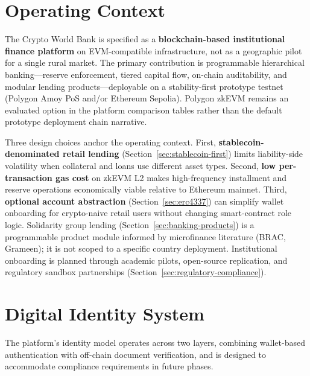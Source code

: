 \documentclass[12pt,a4paper]{report}
\begin{document}
\section{Operating Context}
\label{sec:operating-context}

The Crypto World Bank is specified as a \textbf{blockchain-based institutional finance platform} on EVM-compatible infrastructure, not as a geographic pilot for a single rural market. The primary contribution is programmable hierarchical banking---reserve enforcement, tiered capital flow, on-chain auditability, and modular lending products---deployable on a stability-first prototype testnet (Polygon Amoy PoS and/or Ethereum Sepolia). Polygon zkEVM remains an evaluated option in the platform comparison tables rather than the default prototype deployment chain narrative.

Three design choices anchor the operating context. First, \textbf{stablecoin-denominated retail lending} (Section~\ref{sec:stablecoin-first}) limits liability-side volatility when collateral and loans use different asset types. Second, \textbf{low per-transaction gas cost} on zkEVM L2 makes high-frequency installment and reserve operations economically viable relative to Ethereum mainnet. Third, \textbf{optional account abstraction} (Section~\ref{sec:erc4337}) can simplify wallet onboarding for crypto-naive retail users without changing smart-contract role logic. Solidarity group lending (Section~\ref{sec:banking-products}) is a programmable product module informed by microfinance literature (BRAC, Grameen); it is not scoped to a specific country deployment. Institutional onboarding is planned through academic pilots, open-source replication, and regulatory sandbox partnerships (Section~\ref{sec:regulatory-compliance}).

\section{Digital Identity System}

The platform's identity model operates across two layers, combining wallet-based authentication with off-chain document verification, and is designed to accommodate compliance requirements in future phases.
\end{document}
